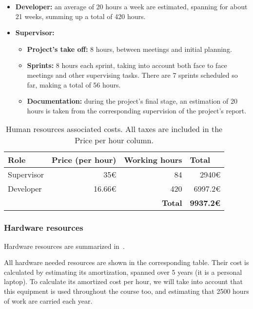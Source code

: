 \begin{itemize}
	\item \textbf{Developer:} an average of 20 hours a week are estimated, spanning for about 21 weeks, summing up a total of 420 hours.
	\item \textbf{Supervisor:}
	\begin{itemize}
		\item \textbf{Project’s take off:} 8 hours, between meetings and initial planning.
		\item \textbf{Sprints:} 8 hours each sprint, taking into account both face to face meetings and other supervising tasks. There are 7 sprints scheduled so far, making a total of 56 hours.
		\item \textbf{Documentation:} during the project’s final stage, an estimation of 20 hours is taken from the corresponding supervision of the project’s report.
	\end{itemize}
\end{itemize}

\begin{table}[h]
	\centering
	\begin{tabular}{lllr}
		\hline
		\textbf{Role} & \textbf{Price (per hour)} & \textbf{Working  hours} & \multicolumn{1}{l}{\textbf{Total}} \\ \hline
		Supervisor & \multicolumn{1}{r}{35€} & \multicolumn{1}{r}{84} & 2940€ \\
		Developer & \multicolumn{1}{r}{16.66€} & \multicolumn{1}{r}{420} & 6997.2€ \\ \hline
		&  & \multicolumn{1}{r}{\textbf{Total}} & \textbf{9937.2€}
	\end{tabular}
	\caption[Initial estimation: human resources costs.]{Human resources associated costs. All taxes are included in the Price per hour column.}
	\label{table:human-resources}
\end{table}

\subsubsection{Hardware resources}

Hardware resources are summarized in~.

All hardware needed resources are shown in the corresponding table. Their cost is calculated by estimating its amortization, spanned over 5 years (it is a personal laptop). To calculate its amortized cost per hour, we will take into account that this equipment is used throughout the course too, and estimating that 2500 hours of work are carried each year.

